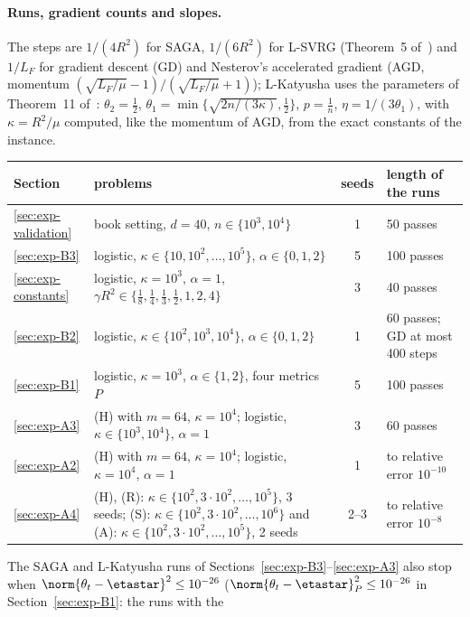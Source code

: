 \paragraph{Runs, gradient counts and slopes.}
The steps are $1/(4R^2)$ for SAGA, $1/(6R^2)$ for L-SVRG (Theorem~5 of~\cite{kovalev2020dont}) and $1/L_F$ for gradient
descent (GD) and Nesterov's accelerated gradient (AGD, momentum $(\sqrt{L_F/\mu}-1)/(\sqrt{L_F/\mu}+1)$); L-Katyusha uses
the parameters of Theorem~11 of~\cite{kovalev2020dont}: $\theta_2=\frac12$, $\theta_1=\min\{\sqrt{2n/(3\kappa)},\frac12\}$,
$p=\frac1n$, $\eta=1/(3\theta_1)$, with $\kappa=R^2/\mu$ computed, like the momentum of AGD, from the exact constants of the
instance.
\begin{center}
\small
\begin{tabular}{@{}lp{8.6cm}cp{3.6cm}@{}}
\toprule
Section & problems & seeds & length of the runs \\
\midrule
\ref{sec:exp-validation} & book setting, $d=40$, $n\in\{10^3,10^4\}$ & 1 & 50 passes \\
\ref{sec:exp-B3} & logistic, $\kappa\in\{10,10^2,\dots,10^5\}$, $\alpha\in\{0,1,2\}$ & 5 & 100 passes \\
\ref{sec:exp-constants} & logistic, $\kappa=10^3$, $\alpha=1$, $\gamma R^2\in\{\frac18,\frac14,\frac13,\frac12,1,2,4\}$ & 3 & 40 passes \\
\ref{sec:exp-B2} & logistic, $\kappa\in\{10^2,10^3,10^4\}$, $\alpha\in\{0,1,2\}$ & 1 & 60 passes; GD at most 400 steps \\
\ref{sec:exp-B1} & logistic, $\kappa=10^3$, $\alpha\in\{1,2\}$, four metrics $P$ & 5 & 100 passes \\
\ref{sec:exp-A3} & (H) with $m=64$, $\kappa=10^4$; logistic, $\kappa\in\{10^3,10^4\}$, $\alpha=1$ & 3 & 60 passes \\
\ref{sec:exp-A2} & (H) with $m=64$, $\kappa=10^4$; logistic, $\kappa=10^4$, $\alpha=1$ & 1 & to relative error $10^{-10}$ \\
\ref{sec:exp-A4} & (H), (R): $\kappa\in\{10^2,3\cdot10^2,\dots,10^5\}$, 3 seeds; (S): $\kappa\in\{10^2,3\cdot10^2,\dots,10^6\}$ and (A): $\kappa\in\{10^2,3\cdot10^2,\dots,10^5\}$, 2 seeds & 2--3 & to relative error $10^{-8}$ \\
\bottomrule
\end{tabular}
\end{center}
The SAGA and L-Katyusha runs of Sections~\ref{sec:exp-B3}--\ref{sec:exp-A3} also stop when
$\norm{\theta_t-\etastar}^2\le10^{-26}$ ($\norm{\theta_t-\etastar}_P^2\le10^{-26}$ in Section~\ref{sec:exp-B1}: the runs with the
